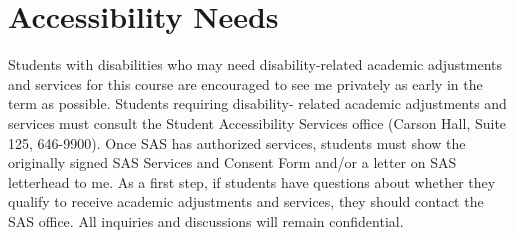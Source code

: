 \section*{Accessibility Needs}
Students with disabilities who may need disability-related academic adjustments and services for this course are encouraged to see me privately as early in the term as possible. Students requiring disability- related academic adjustments and services must consult the Student Accessibility Services office (Carson Hall, Suite 125, 646-9900). Once SAS has authorized services, students must show the originally signed SAS Services and Consent Form and/or a letter on SAS letterhead to me. As a first step, if students have questions about whether they qualify to receive academic adjustments and services, they should contact the SAS office. All inquiries and discussions will remain confidential.





